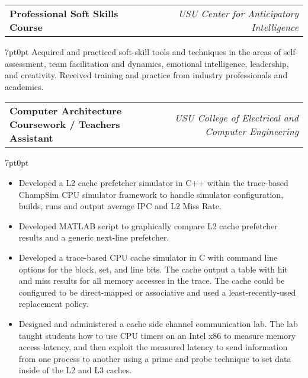 \documentclass[letterpaper,12pt]{article}
\makeatletter
\newcommand{\simpleHeading}[2]{
    \vspace{-1pt}
    \begin{tabular*}{0.99\textwidth}[t]{l@{\extracolsep{\fill}}r}
        #1 & #2 \\
    \end{tabular*}
}
\newcommand{\simpleParagraph}[1]{
    \vspace{-1pt}
    \begin{adjustwidth}{7pt}{0pt}
        #1
    \end{adjustwidth}
}
\makeatother
\begin{document}

    \vspace{10pt}
    \simpleHeading{\textbf{Professional Soft Skills Course}}{\textit{USU Center for Anticipatory Intelligence}}

    \simpleParagraph{Acquired and practiced soft-skill tools and techniques in the areas of self-assessment, team
    facilitation and dynamics, emotional intelligence, leadership, and creativity. Received training and practice
    from industry professionals and academics.}
    
    \vspace{10pt}
    \simpleHeading{\textbf{Computer Architecture Coursework / Teachers Assistant}}
                  {\textit{USU College of Electrical and Computer Engineering}}

    \simpleParagraph{
        \begin{itemize}
            \item Developed a L2 cache prefetcher simulator in C++ within the trace-based ChampSim CPU
                simulator framework to handle simulator configuration, builds, runs and output average
                IPC and L2 Miss Rate.

            \item Developed MATLAB script to graphically compare L2 cache prefetcher results and a
                generic next-line prefetcher.

            \item Developed a trace-based CPU cache simulator in C with command line options for the
                block, set, and line bits. The cache output a table with hit and miss results for all
                memory accesses in the trace. The cache could be configured to be direct-mapped or
                associative and used a least-recently-used replacement policy.

            \item Designed and administered a cache side channel communication lab. The lab taught
                students how to use CPU timers on an Intel x86 to measure memory access latency,
                and then exploit the measured latency to send information from one process to another
                using a prime and probe technique to set data inside of the L2 and L3 caches.

        \end{itemize}
    }
\end{document}
